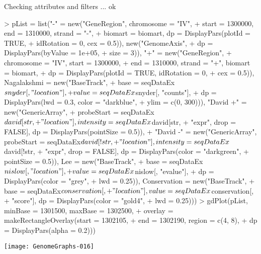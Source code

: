 \documentclass[11pt]{article}
\begin{document}
\begin{Schunk}
\begin{Soutput}
Checking attributes and filters ... ok
\end{Soutput}
\begin{Sinput}
> pList = list("-" = new("GeneRegion", chromosome = "IV", 
+     start = 1300000, end = 1310000, strand = "-", 
+     biomart = biomart, dp = DisplayPars(plotId = TRUE, 
+         idRotation = 0, cex = 0.5)), new("GenomeAxis", 
+     dp = DisplayPars(byValue = 1e+05, 
+         size = 3)), "+" = new("GeneRegion", 
+     chromosome = "IV", start = 1300000, 
+     end = 1310000, strand = "+", biomart = biomart, 
+     dp = DisplayPars(plotId = TRUE, idRotation = 0, 
+         cex = 0.5)), Nagalakshmi = new("BaseTrack", 
+     base = seqDataEx$snyder[, "location"], 
+     value = seqDataEx$snyder[, "counts"], 
+     dp = DisplayPars(lwd = 0.3, color = "darkblue", 
+         ylim = c(0, 300))), "David +" = new("GenericArray", 
+     probeStart = seqDataEx$david[str, 
+         "location"], intensity = seqDataEx$david[str, 
+         "expr", drop = FALSE], dp = DisplayPars(pointSize = 0.5)), 
+     "David -" = new("GenericArray", probeStart = seqDataEx$david[!str, 
+         "location"], intensity = seqDataEx$david[!str, 
+         "expr", drop = FALSE], dp = DisplayPars(color = "darkgreen", 
+         pointSize = 0.5)), Lee = new("BaseTrack", 
+         base = seqDataEx$nislow[, "location"], 
+         value = seqDataEx$nislow[, "evalue"], 
+         dp = DisplayPars(color = "grey", 
+             lwd = 0.25)), Conservation = new("BaseTrack", 
+         base = seqDataEx$conservation[, 
+             "location"], value = seqDataEx$conservation[, 
+             "score"], dp = DisplayPars(color = "gold4", 
+             lwd = 0.25)))
> gdPlot(pList, minBase = 1301500, maxBase = 1302500, 
+     overlay = makeRectangleOverlay(start = 1302105, 
+         end = 1302190, region = c(4, 8), 
+         dp = DisplayPars(alpha = 0.2)))
\end{Sinput}
\end{Schunk}
\texttt{[image: GenomeGraphs-016]}
\end{document}
